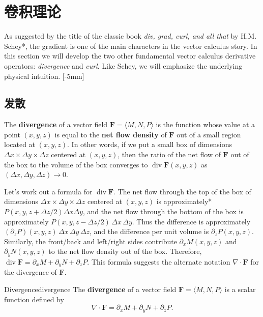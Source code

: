 \documentclass[indent]{watsonbook}
\begin{document}
\section{卷积理论} \label{sec:divcurl}

As suggested by the title of the classic book \textit{div, grad, curl, and all that} by H.M. Schey*, the gradient is one of the main characters in the vector calculus story. In this section we will develop the two other fundamental vector calculus derivative operators: \textit{divergence} and \textit{curl}. Like Schey, we will emphasize the underlying physical intuition. [-5mm]

\subsection{发散}


The \textbf{divergence} of a vector field $\mathbf{F} = \langle M, N, P \rangle$ is the function whose value at a point $(x,y,z)$ is equal to the \textbf{net flow density} of $\mathbf{F}$ out of a small region located at $(x,y,z)$. In other words, if we put a small box of dimensions $\Delta x \times \Delta y \times \Delta z$ centered at $(x,y,z)$, then the ratio of the net flow of $\mathbf{F}$ out of the box to the volume of the box converges to $\operatorname{div}\mathbf{F}(x,y,z)$ as $(\Delta x, \Delta y, \Delta z) \to 0$.

Let's work out a formula for $\operatorname{div}\mathbf{F}$. The net flow through the top of the box of dimensions $\Delta x \times \Delta y \times \Delta z$ centered at $(x,y,z)$ is approximately*  $P(x,y,z+\Delta z/2)\Delta x \Delta y$, and the net flow through the bottom of the box is approximately $P(x, y, z-\Delta z/2)\, \Delta x \,\Delta y$. Thus the difference is approximately $(\partial_z P)(x,y,z) \, \Delta x \,  \Delta y \, \Delta z$, and the difference per unit volume is $\partial_z P(x,y,z)$. Similarly, the front/back and left/right sides contribute $\partial_x M(x,y,z)$ and $\partial_y N(x,y,z)$ to the net flow density out of the box. Therefore, $\operatorname{div} \mathbf{F} = \partial_x M  +\partial _y N + \partial_zP$. This formula suggests the alternate notation $\nabla \cdot \mathbf{F}$ for the divergence of $\mathbf{F}$.

\begin{defn}{Divergence}{divergence}
  The \textbf{divergence} of a vector field
  $\mathbf{F} = \langle M, N, P \rangle$ is a scalar function defined
  by
  \[
    \nabla \cdot \mathbf{F} = \partial_x M  +\partial _y N + \partial_z
    P.
  \]
\end{defn}
\end{document}
